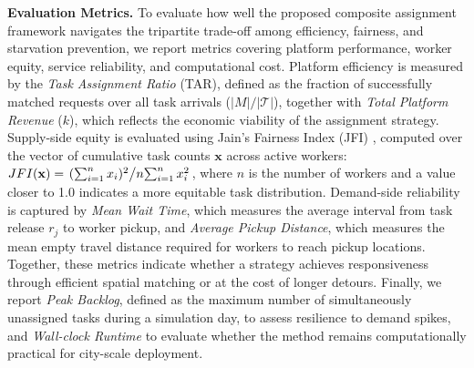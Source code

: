 \textbf{Evaluation Metrics.}
To evaluate how well the proposed composite assignment framework navigates the tripartite trade-off among efficiency, fairness, and starvation prevention, we report metrics covering platform performance, worker equity, service reliability, and computational cost. Platform efficiency is measured by the \textit{Task Assignment Ratio} (TAR), defined as the fraction of successfully matched requests over all task arrivals ($|M|/|\mathcal{T}|$), together with \textit{Total Platform Revenue} ($k$), which reflects the economic viability of the assignment strategy. Supply-side equity is evaluated using Jain's Fairness Index (JFI) \cite{JFI-Original}, computed over the vector of cumulative task counts $\mathbf{x}$ across active workers:
$JFI(\mathbf{x}) = \left.{(\sum_{i=1}^{n} x_i)^2} \middle/n {\sum_{i=1}^{n} x_i^2} \right.$,
where $n$ is the number of workers and a value closer to 1.0 indicates a more equitable task distribution. Demand-side reliability is captured by \textit{Mean Wait Time}, which measures the average interval from task release $r_j$ to worker pickup, and \textit{Average Pickup Distance}, which measures the mean empty travel distance required for workers to reach pickup locations. Together, these metrics indicate whether a strategy achieves responsiveness through efficient spatial matching or at the cost of longer detours. Finally, we report \textit{Peak Backlog}, defined as the maximum number of simultaneously unassigned tasks during a simulation day, to assess resilience to demand spikes, and \textit{Wall-clock Runtime} to evaluate whether the method remains computationally practical for city-scale deployment.

